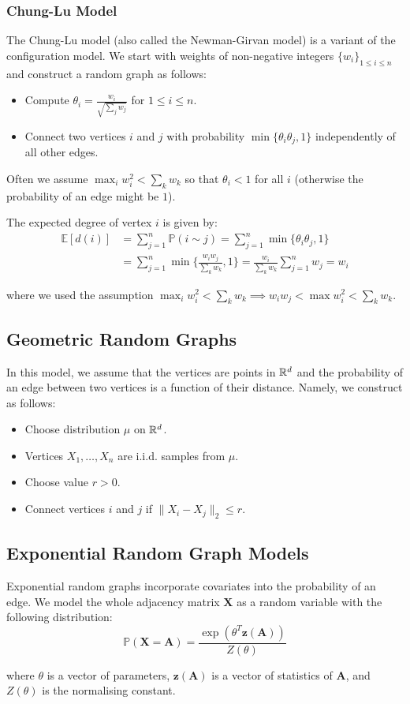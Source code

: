 \documentclass{article}
\begin{document}
\subsubsection{Chung-Lu Model}

The Chung-Lu model (also called the Newman-Girvan model) is a variant of the configuration model. We start with weights of non-negative integers $\{w_i\}_{1\leq i \leq n}$ and construct a random graph as follows:
\begin{itemize}
    \item Compute $\theta_i = \frac{w_i}{\sqrt{\sum_j w_j}}$ for $1\leq i \leq n$.
    \item Connect two vertices $i$ and $j$ with probability $\min \{\theta_i \theta_j, 1\}$ independently of all other edges.
\end{itemize}

Often we assume $\max_i w_i^2 < \sum_k w_k$ so that $\theta_i < 1$ for all $i$ (otherwise the probability of an edge might be $1$).  

The expected degree of vertex $i$ is given by:
\begin{align*}
    \mathbb{E}[d(i)] &= \sum_{j=1}^{n} \mathbb{P}(i \sim j) = \sum_{j=1}^{n} \min \{\theta_i \theta_j, 1\} \\
    &= \sum_{j=1}^{n} \min \{\frac{w_iw_j}{\sum_k w_k}, 1\} = \frac{w_i}{\sum_k w_k} \sum_{j=1}^{n} w_j = w_i
\end{align*}

where we used the assumption $\max_i w_i^2 < \sum_k w_k \implies w_iw_j < \max w_i^2 < \sum_k w_k$. 

\subsection{Geometric Random Graphs}
In this model, we assume that the vertices are points in $\mathbb{R}^d$ and the probability of an edge between two vertices is a function of their distance. Namely, we construct as follows:
\begin{itemize}
    \item Choose distribution $\mu$ on $\mathbb{R}^d$.
    \item Vertices $X_1,\ldots,X_n$ are i.i.d. samples from $\mu$.
    \item Choose value $r>0$.
    \item Connect vertices $i$ and $j$ if $\|X_i-X_j\|_2\leq r$.
\end{itemize}


\subsection{Exponential Random Graph Models}
Exponential random graphs incorporate covariates into the probability of an edge. We model the whole adjacency matrix $\mathbf{X}$ as a random variable with the following distribution:
\begin{equation*}
    \mathbb{P}(\mathbf{X}=\mathbf{A}) = \frac{\exp(\theta^T \mathbf{z}(\mathbf{A}))}{Z(\theta)}
\end{equation*}

where $\theta$ is a vector of parameters, $\mathbf{z}(\mathbf{A})$ is a vector of statistics of $\mathbf{A}$, and $Z(\theta)$ is the normalising constant. 


\newpage


\end{document}
